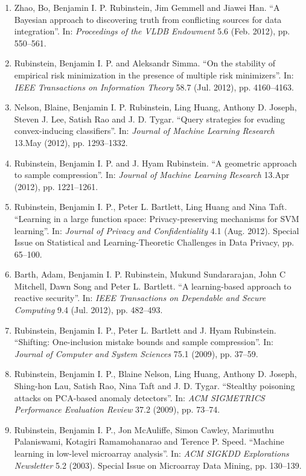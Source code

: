 \documentclass[a4paper,12pt]{article}
\begin{document}
\begin{enumerate}
\item Zhao, Bo, Benjamin I. P. Rubinstein, Jim Gemmell and Jiawei Han.
``A Bayesian approach to discovering truth from conflicting sources for data integration''.
In: \emph{Proceedings of the VLDB Endowment} 5.6 (Feb. 2012), pp. 550--561.

\item Rubinstein, Benjamin I. P. and Aleksandr Simma.
``On the stability of empirical risk minimization in the presence of multiple risk minimizers''.
In: \emph{IEEE Transactions on Information Theory} 58.7 (Jul. 2012), pp. 4160--4163.

\item Nelson, Blaine, Benjamin I. P. Rubinstein, Ling Huang, Anthony D. Joseph, Steven J. Lee, Satish Rao and J. D. Tygar.
``Query strategies for evading convex-inducing classifiers''.
In: \emph{Journal of Machine Learning Research} 13.May (2012), pp. 1293--1332.

\item Rubinstein, Benjamin I. P. and J. Hyam Rubinstein.
``A geometric approach to sample compression''.
In: \emph{Journal of Machine Learning Research} 13.Apr (2012), pp. 1221--1261.

\item Rubinstein, Benjamin I. P., Peter L. Bartlett, Ling Huang and Nina Taft.
``Learning in a large function space: Privacy-preserving mechanisms for SVM learning''.
In: \emph{Journal of Privacy and Confidentiality} 4.1 (Aug. 2012). Special Issue on Statistical and Learning-Theoretic Challenges in Data Privacy, pp. 65--100.

\item Barth, Adam, Benjamin I. P. Rubinstein, Mukund Sundararajan, John C Mitchell, Dawn Song and Peter L. Bartlett.
``A learning-based approach to reactive security''.
In: \emph{IEEE Transactions on Dependable and Secure Computing} 9.4 (Jul. 2012), pp. 482--493.

\item Rubinstein, Benjamin I. P., Peter L. Bartlett and J. Hyam Rubinstein.
``Shifting: One-inclusion mistake bounds and sample compression''.
In: \emph{Journal of Computer and System Sciences} 75.1 (2009), pp. 37--59.

\item Rubinstein, Benjamin I. P., Blaine Nelson, Ling Huang, Anthony D. Joseph, Shing-hon Lau, Satish Rao, Nina Taft and J. D. Tygar.
``Stealthy poisoning attacks on PCA-based anomaly detectors''.
In: \emph{ACM SIGMETRICS Performance Evaluation Review} 37.2 (2009), pp. 73--74.

\item Rubinstein, Benjamin I. P., Jon McAuliffe, Simon Cawley, Marimuthu Palaniswami, Kotagiri Ramamohanarao and Terence P. Speed.
``Machine learning in low-level microarray analysis''.
In: \emph{ACM SIGKDD Explorations Newsletter} 5.2 (2003). Special Issue on Microarray Data Mining, pp. 130--139.


\setcounter{list}{\value{enumi}}
\end{enumerate}
\end{document}
